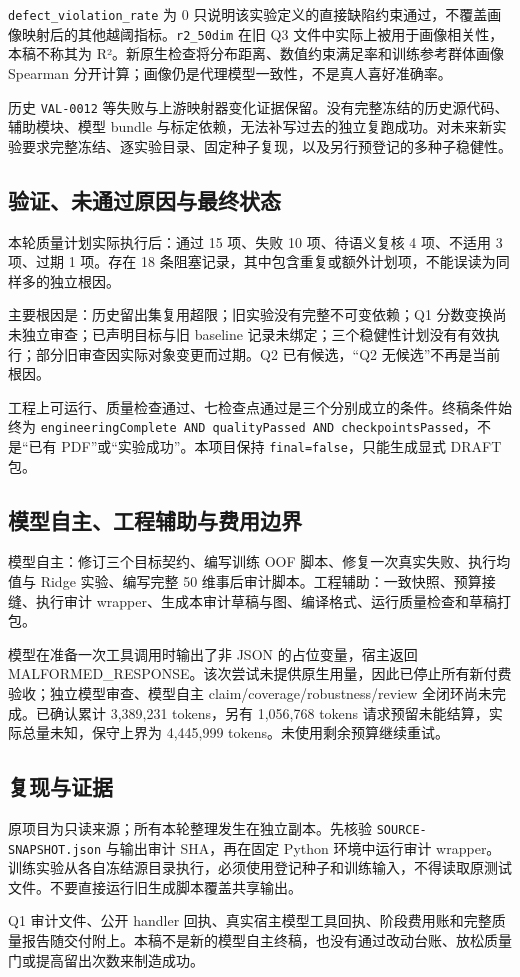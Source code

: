 \documentclass[
  a4paper,12pt]{article}
\begin{document}
\texttt{defect\_violation\_rate} 为 0
只说明该实验定义的直接缺陷约束通过，不覆盖画像映射后的其他越阈指标。\texttt{r2\_50dim}
在旧 Q3 文件中实际上被用于画像相关性，本稿不称其为
R²。新原生检查将分布距离、数值约束满足率和训练参考群体画像 Spearman
分开计算；画像仍是代理模型一致性，不是真人喜好准确率。

历史 \texttt{VAL-0012}
等失败与上游映射器变化证据保留。没有完整冻结的历史源代码、辅助模块、模型
bundle
与标定依赖，无法补写过去的独立复跑成功。对未来新实验要求完整冻结、逐实验目录、固定种子复现，以及另行预登记的多种子稳健性。

\subsection{验证、未通过原因与最终状态}\label{ux9a8cux8bc1ux672aux901aux8fc7ux539fux56e0ux4e0eux6700ux7ec8ux72b6ux6001}

本轮质量计划实际执行后：通过 15 项、失败 10 项、待语义复核 4 项、不适用
3 项、过期 1 项。存在 18
条阻塞记录，其中包含重复或额外计划项，不能误读为同样多的独立根因。

主要根因是：历史留出集复用超限；旧实验没有完整不可变依赖；Q1
分数变换尚未独立审查；已声明目标与旧 baseline
记录未绑定；三个稳健性计划没有有效执行；部分旧审查因实际对象变更而过期。Q2
已有候选，``Q2 无候选''不再是当前根因。

工程上可运行、质量检查通过、七检查点通过是三个分别成立的条件。终稿条件始终为
\texttt{engineeringComplete\ AND\ qualityPassed\ AND\ checkpointsPassed}，不是``已有
PDF''或``实验成功''。本项目保持 \texttt{final=false}，只能生成显式 DRAFT
包。

\subsection{模型自主、工程辅助与费用边界}\label{ux6a21ux578bux81eaux4e3bux5de5ux7a0bux8f85ux52a9ux4e0eux8d39ux7528ux8fb9ux754c}

模型自主：修订三个目标契约、编写训练 OOF
脚本、修复一次真实失败、执行均值与 Ridge 实验、编写完整 50
维事后审计脚本。工程辅助：一致快照、预算接缝、执行审计
wrapper、生成本审计草稿与图、编译格式、运行质量检查和草稿打包。

模型在准备一次工具调用时输出了非 JSON 的占位变量，宿主返回
MALFORMED\_RESPONSE。该次尝试未提供原生用量，因此已停止所有新付费验收；独立模型审查、模型自主
claim/coverage/robustness/review 全闭环尚未完成。已确认累计 3,389,231
tokens，另有 1,056,768 tokens 请求预留未能结算，实际总量未知，保守上界为
4,445,999 tokens。未使用剩余预算继续重试。

\subsection{复现与证据}\label{ux590dux73b0ux4e0eux8bc1ux636e}

原项目为只读来源；所有本轮整理发生在独立副本。先核验
\texttt{SOURCE-SNAPSHOT.json} 与输出审计 SHA，再在固定 Python
环境中运行审计
wrapper。训练实验从各自冻结源目录执行，必须使用登记种子和训练输入，不得读取原测试文件。不要直接运行旧生成脚本覆盖共享输出。

Q1 审计文件、公开 handler
回执、真实宿主模型工具回执、阶段费用账和完整质量报告随交付附上。本稿不是新的模型自主终稿，也没有通过改动台账、放松质量门或提高留出次数来制造成功。
\end{document}

